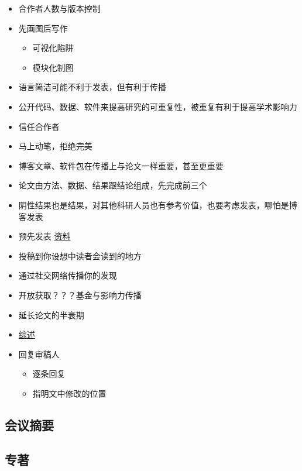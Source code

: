 \documentclass[]{tufte-book}
\providecommand{\tightlist}{%
  \setlength{\itemsep}{0pt}\setlength{\parskip}{0pt}}
\begin{document}
\begin{itemize}
\item
  合作者人数与版本控制
\item
  先画图后写作

  \begin{itemize}
  \tightlist
  \item
    可视化陷阱
  \item
    模块化制图
  \end{itemize}
\item
  语言简洁可能不利于发表，但有利于传播
\item
  公开代码、数据、软件来提高研究的可重复性，被重复有利于提高学术影响力
\item
  信任合作者
\item
  马上动笔，拒绝完美
\item
  博客文章、软件包在传播上与论文一样重要，甚至更重要
\item
  论文由方法、数据、结果跟结论组成，先完成前三个
\item
  阴性结果也是结果，对其他科研人员也有参考价值，也要考虑发表，哪怕是博客发表
\item
  预先发表 \href{https://deevybee.blogspot.com/2018/06/preprint-publication-as-karaoke.html}{资料}
\item
  投稿到你设想中读者会读到的地方
\item
  通过社交网络传播你的发现
\item
  开放获取？？？基金与影响力传播
\item
  延长论文的半衰期
\item
  \href{https://rayyan.qcri.org}{综述}
\item
  回复审稿人

  \begin{itemize}
  \tightlist
  \item
    逐条回复
  \item
    指明文中修改的位置
  \end{itemize}
\end{itemize}

\hypertarget{ux4f1aux8baeux6458ux8981}{%
\subsection{会议摘要}\label{ux4f1aux8baeux6458ux8981}}

\hypertarget{ux4e13ux8457}{%
\subsection{专著}\label{ux4e13ux8457}}
\end{document}
